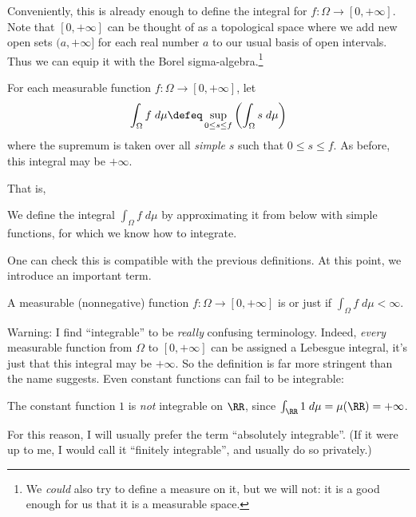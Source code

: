 Conveniently, this is already enough to define the integral
for $f \colon \Omega \to [0, +\infty]$.
Note that $[0,+\infty]$ can be thought of as a topological space
where we add new open sets $(a,+\infty]$ %
for each real number $a$ to our usual basis of open intervals.
Thus we can equip it with the Borel sigma-algebra.\footnote{We
	\emph{could} also try to define a measure on it,
	but we will not: it is a good enough for us
	that it is a measurable space.}
\begin{step}
	For each measurable function $f \colon \Omega \to [0, +\infty]$, let
	\[ \int_\Omega f \; d\mu \defeq
		\sup_{0 \le s \le f} \left( \int_\Omega s \; d\mu \right) \]
	where the supremum is taken over all \emph{simple} $s$
	such that $0 \le s \le f$.
	As before, this integral may be $+\infty$.
\end{step}

That is,
\begin{moral}
	We define the integral $\int_\Omega f \; d\mu$ by approximating it from below with simple functions,
	for which we know how to integrate.
\end{moral}

One can check this is compatible with the previous definitions.
At this point, we introduce an important term.
\begin{definition}
	A measurable (nonnegative) function $f \colon \Omega \to [0, +\infty]$
	is 
	or just  if $\int_\Omega f \; d\mu < \infty$.
\end{definition}
Warning: I find ``integrable'' to be \emph{really} confusing terminology.
Indeed, \emph{every} measurable function from $\Omega$ to $[0,+\infty]$
can be assigned a Lebesgue integral, it's just that
this integral may be $+\infty$.
So the definition is far more stringent than the name suggests.
Even constant functions can fail to be integrable:
\begin{example}
	The constant function $1$ is \emph{not} integrable on $\RR$,
	since $\int_\RR 1 \; d\mu = \mu(\RR) = +\infty$.
\end{example}
For this reason, I will usually prefer the term ``absolutely integrable''.
(If it were up to me, I would call it ``finitely integrable'',
and usually do so privately.)

